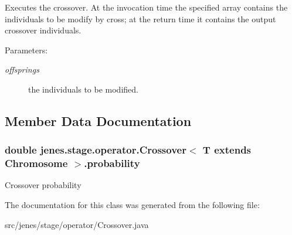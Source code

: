 Executes the crossover. At the invocation time the specified array contains the individuals to be modify by cross; at the return time it contains the output crossover individuals.

\begin{Desc}
\item[Parameters:]
\begin{description}
\item[{\em offsprings}]the individuals to be modified. \end{description}
\end{Desc}


\subsection{Member Data Documentation}
\hypertarget{classjenes_1_1stage_1_1operator_1_1_crossover_3_01_t_01extends_01_chromosome_01_4_2b4aec7312a223ba84862f7848b14542}{
\subsubsection[probability]{\setlength{\rightskip}{0pt plus 5cm}double jenes.stage.operator.Crossover$<$ T extends Chromosome $>$.{\bf probability}}}
\label{classjenes_1_1stage_1_1operator_1_1_crossover_3_01_t_01extends_01_chromosome_01_4_2b4aec7312a223ba84862f7848b14542}


Crossover probability 

The documentation for this class was generated from the following file:\begin{CompactItemize}
\item 
src/jenes/stage/operator/Crossover.java\end{CompactItemize}
